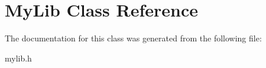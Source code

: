 \hypertarget{classMyLib}{}\section{My\+Lib Class Reference}
\label{classMyLib}


The documentation for this class was generated from the following file\+:\begin{DoxyCompactItemize}
\item 
mylib.\+h\end{DoxyCompactItemize}
